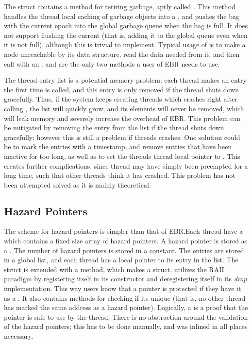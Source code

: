 \documentclass[b5paper]{report}
\begin{document}
The  struct contains a method for retiring garbage, aptly called
. This method handles the thread local caching of garbage
objects into a , and pushes the bag with the current epoch into the
global garbage queue when the bag is full. It does not support flushing the
current  (that is, adding it to the global queue even when it is not
full), although this is trivial to implement. Typical usage of
 is to make a node unreachable by its data structure, read
the data needed from it, and then call  with an
.   and  are the only two
methods a user of EBR needs to use.

The thread entry list is a potential memory problem: each thread makes an entry
the first time  is called, and this entry is only removed if the
thread shuts down gracefully. Thus, if the system keeps creating threads which
crashes right after calling , the list will quickly grow, and its
elements will never be removed, which will leak memory and severely increase the
overhead of EBR. This problem can be mitigated by removing the entry from the
list if the thread shuts down gracefully; however this is still a problem if
threads crashes. One solution could be to mark the entries with a timestamp, and
remove entries that have been inactive for too long, as well as to set the
threads thread local pointer to . This creates further complications,
since thread may have simply been preempted for a long time, such that other
threads think it has crashed.  This problem has not been attempted solved as it
is mainly theoretical.\label{sec:thread-cleanup}

\subsection{Hazard Pointers}

The scheme for hazard pointers is simpler than that of EBR.\@ Each thread have a
 which contains a fixed size array of hazard pointers. A
hazard pointer is stored as a .  The number of hazard pointers
is stored in a constant. The entries are stored in a global list, and each
thread has a local pointer to its entry in the list. The  struct is
extended with a  method, which makes a  struct.
 utilizes the RAII paradigm by registering itself in its
constructor and deregistering itself in its \emph{drop} implementation. This way
users know that a pointer is protected if they have it as a . It
also contains methods for checking if its unique (that is, no other thread has
marked the same address as a hazard pointer).  Logically, a  is
a proof that the pointer is safe to use by the thread. There is no abstraction
around the validation of the hazard pointers; this has to be done manually, and
was inlined in all places necessary.
\end{document}
